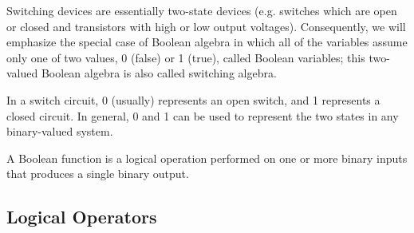 \documentclass[a4paper,12pt]{article}
\begin{document}
Switching devices are essentially two-state devices (e.g. switches which are open or closed and transistors with high or low output voltages). Consequently, we will emphasize the special case of Boolean algebra in which all of the variables assume only one of two values, 0 (false) or 1 (true), called Boolean variables; this two-valued Boolean algebra is also called switching algebra.

In a switch circuit, 0 (usually) represents an open switch, and 1 represents a closed circuit. In general, 0 and 1 can be used to represent the two states in any binary-valued system.

A Boolean function is a logical operation performed on one or more binary inputs that produces a single binary output.
\subsection{Logical Operators}
\end{document}
